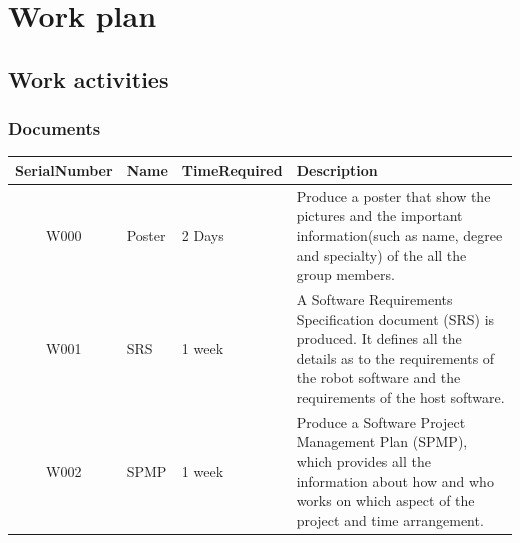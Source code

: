 \documentclass[11pt, a4paper]{report}
\begin{document}
\chapter{Work plan}



\section{Work activities}



\subsection{Documents}
\begin{tabular}{|c|p{1cm}|p{3cm}|p{7cm}|}%
\hline
\centering SerialNumber     &	Name 	&	TimeRequired		&	Description	       											\\ \hline
W000 & Poster & 2 Days & Produce a poster that show the pictures and the important
information(such as name, degree and  specialty) of the all the group members.  \\ \hline

W001		&	SRS	&	1 week	&	A Software Requirements Specification document (SRS) is produced. It defines all the details as to the requirements of the robot software and the requirements of the host software.  \\ \hline
W002		&	SPMP	&	1 week	&	Produce a Software Project Management Plan (SPMP), which provides all the information about how and who works on which aspect of the project and time arrangement. \\ \hline	
\end{tabular}


\end{document}
